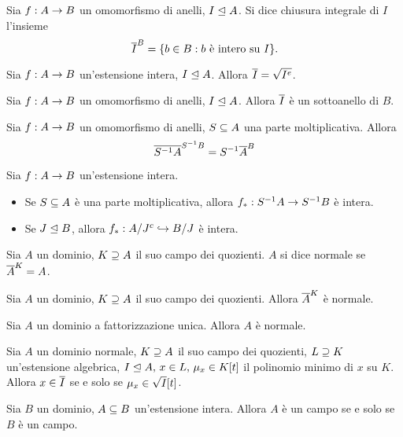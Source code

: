 \begin{definition}
Sia $f:A\rightarrow B$ un omomorfismo di anelli, $I\trianglelefteq A$. Si dice chiusura integrale di $I$ l'insieme
$$
\overline{I}^B=\{b\in B:\text{$b$ è intero su $I$}\}.
$$
\end{definition}
\begin{proposition}
Sia $f:A\rightarrow B$ un'estensione intera, $I\trianglelefteq A$. Allora $\overline{I}=\sqrt{I^e}$.
\end{proposition}
\begin{proposition}
Sia $f:A\rightarrow B$ un omomorfismo di anelli, $I\trianglelefteq A$. Allora $\overline{I}$ è un sottoanello di $B$.
\end{proposition}
\begin{proposition}
Sia $f:A\rightarrow B$ un omomorfismo di anelli, $S\subseteq A$ una parte moltiplicativa. Allora
$$
\overline{S^{-1}A}^{S^{-1}B}=S^{-1}\overline{A}^B
$$
\end{proposition}
\begin{proposition}
Sia $f:A\rightarrow B$ un'estensione intera.
\begin{itemize}
\item Se $S\subseteq A$ è una parte moltiplicativa, allora $f_*:S^{-1}A\rightarrow S^{-1}B$ è intera.
\item Se $J\trianglelefteq B$, allora $f_*:A/J^c\hookrightarrow B/J$ è intera.
\end{itemize}
\end{proposition}
\begin{definition}
Sia $A$ un dominio, $K\supseteq A$ il suo campo dei quozienti. $A$ si dice normale se $\overline{A}^K=A$.
\end{definition}
\begin{proposition}
Sia $A$ un dominio, $K\supseteq A$ il suo campo dei quozienti. Allora $\overline{A}^K$ è normale.
\end{proposition}
\begin{proposition}
Sia $A$ un dominio a fattorizzazione unica. Allora $A$ è normale.
\end{proposition}
\begin{proposition}
Sia $A$ un dominio normale, $K\supseteq A$ il suo campo dei quozienti, $L\supseteq K$ un'estensione algebrica, $I\trianglelefteq A,\,\allowbreak x\in L,\,\allowbreak\mu_x\in K[t]$ il polinomio minimo di $x$ su $K$. Allora $x\in\overline{I}$ se e solo se $\mu_x\in\sqrt{I}[t]$.
\end{proposition}
\begin{proposition}
Sia $B$ un dominio, $A\subseteq B$ un'estensione intera. Allora $A$ è un campo se e solo se $B$ è un campo.
\end{proposition}
